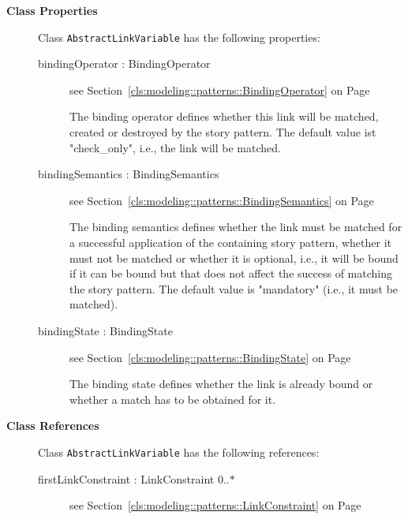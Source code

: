 \begin{description}

	\item[\textbf{Class Properties}] Class \texttt{AbstractLinkVariable} has the following properties:
	\begin{description}
\item[bindingOperator : BindingOperator 	]
see Section~\ref{cls:modeling::patterns::BindingOperator} on Page~\pageref{cls:modeling::patterns::BindingOperator}
\hspace{\fill}
\nopagebreak


	
			
The binding operator defines whether this link will be matched, created or destroyed by the story pattern. The default value ist "check\_only", i.e., the link will be matched.	
		
	
\item[bindingSemantics : BindingSemantics 	]
see Section~\ref{cls:modeling::patterns::BindingSemantics} on Page~\pageref{cls:modeling::patterns::BindingSemantics}
\hspace{\fill}
\nopagebreak


	
			
The binding semantics defines whether the link must be matched for a successful application of the containing story pattern, whether it must not be matched or whether it is optional, i.e., it will be bound if it can be bound but that does not affect the success of matching the story pattern. The default value is "mandatory" (i.e., it must be matched).	
		
	
\item[bindingState : BindingState 	]
see Section~\ref{cls:modeling::patterns::BindingState} on Page~\pageref{cls:modeling::patterns::BindingState}
\hspace{\fill}
\nopagebreak


	
			
The binding state defines whether the link is already bound or whether a match has to be obtained for it.	
		
	
	\end{description}
	
	\item[\textbf{Class References}] Class \texttt{AbstractLinkVariable} has the following references:
	\begin{description}
\item[firstLinkConstraint : LinkConstraint 			0..$*$]
see Section~\ref{cls:modeling::patterns::LinkConstraint} on Page~\pageref{cls:modeling::patterns::LinkConstraint}
\hspace{\fill}
\nopagebreak



\end{description}
\end{description}
